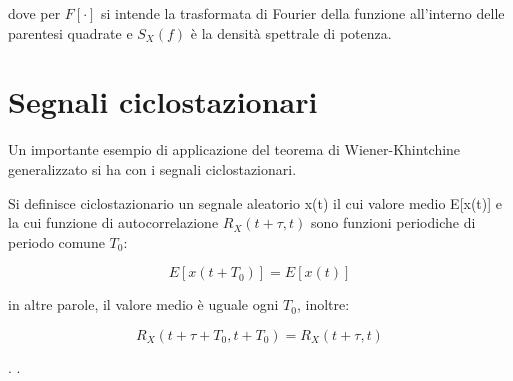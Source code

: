 dove per $F[\cdot]$ si intende la trasformata di Fourier della funzione all'interno delle parentesi quadrate 
e $S_X (f)$ è la densità spettrale di potenza. \newline 

\newpage 

\section{Segnali ciclostazionari}

Un importante esempio di applicazione del teorema di Wiener-Khintchine generalizzato si ha con i segnali ciclostazionari. \newline 

Si definisce ciclostazionario un segnale aleatorio x(t) il cui valore medio E[x(t)] e la cui funzione di autocorrelazione $R_X (t + \tau, t)$ sono 
funzioni periodiche di periodo comune $T_0$: 

{
    \Large 
    \begin{equation}
        E[x(t + T_0)] = E[x(t)]
    \end{equation}
}

in altre parole, il valore medio è uguale ogni $T_0$, inoltre: 

{
    \Large 
    \begin{equation}
        R_X (t + \tau + T_0, t + T_0) = R_X (t + \tau, t)
    \end{equation}
}

\newpage
. 
\newpage
. 
\newpage